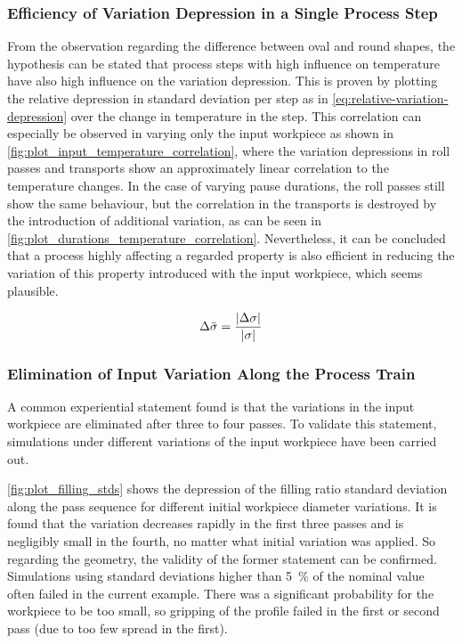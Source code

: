 \subsubsection{Efficiency of Variation Depression in a Single Process Step}

From the observation regarding the difference between oval and round shapes, the hypothesis can be stated that process steps with high influence on temperature have also high influence on the variation depression.
This is proven by plotting the relative depression in standard deviation per step as in \autoref{eq:relative-variation-depression} over the change in temperature in the step.
This correlation can especially be observed in varying only the input workpiece as shown in \autoref{fig:plot_input_temperature_correlation}, where the variation depressions in roll passes and transports show an approximately linear correlation to the temperature changes.
In the case of varying pause durations, the roll passes still show the same behaviour, but the correlation in the transports is destroyed by the introduction of additional variation, as can be seen in \autoref{fig:plot_durations_temperature_correlation}.
Nevertheless, it can be concluded that a process highly affecting a regarded property is also efficient in reducing the variation of this property introduced with the input workpiece, which seems plausible.

\begin{equation}
    {\Delta\bar{\sigma}} = \frac{{\lvert {\Delta {\sigma}} \rvert}}{{\lvert {\sigma} \rvert}}
    \label{eq:relative-variation-depression}
\end{equation}


\subsubsection{Elimination of Input Variation Along the Process Train}

A common experiential statement found is that the variations in the input workpiece are eliminated after three to four passes.
To validate this statement, simulations under different variations of the input workpiece have been carried out.

\autoref{fig:plot_filling_stds} shows the depression of the filling ratio standard deviation along the pass sequence for different initial workpiece diameter variations.
It is found that the variation decreases rapidly in the first three passes and is negligibly small in the fourth, no matter what initial variation was applied.
So regarding the geometry, the validity of the former statement can be confirmed.
Simulations using standard deviations higher than \qty{5}{\percent} of the nominal value often failed in the current example.
There was a significant probability for the workpiece to be too small, so gripping of the profile failed in the first or second pass (due to too few spread in the first).

